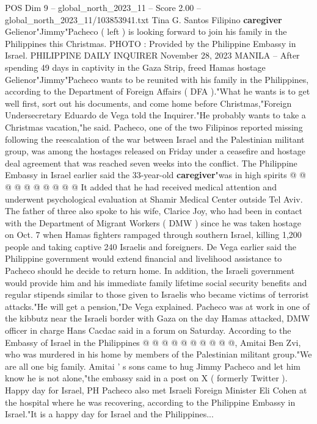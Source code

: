 \begin{textsample}{POS Dim 9 – global\_north\_2023\_11 – Score 2.00 – global\_north\_2023\_11/103853941.txt}  \label{ex:f9_pos_152}
Tina G.
Santos Filipino \textbf{caregiver} Gelienor"Jimmy"Pacheco ( left ) is looking forward to join his family in the Philippines this Christmas.
PHOTO : Provided by the Philippine Embassy in Israel.
PHILIPPINE DAILY INQUIRER November 28, 2023 MANILA -- After spending 49 days in captivity in the Gaza Strip, freed Hamas hostage Gelienor"Jimmy"Pacheco wants to be reunited with his family in the Philippines, according to the Department of Foreign Affairs ( DFA )."What he wants is to get well first, sort out his documents, and come home before Christmas,"Foreign Undersecretary Eduardo de Vega told the Inquirer."He probably wants to take a Christmas vacation,"he said.
Pacheco, one of the two Filipinos reported missing following the reescalation of the war between Israel and the Palestinian militant group, was among the hostages released on Friday under a ceasefire and hostage deal agreement that was reached seven weeks into the conflict.
The Philippine Embassy in Israel earlier said the 33-year-old \textbf{caregiver}"was in high spirits @ @ @ @ @ @ @ @ @ @ It added that he had received medical attention and underwent psychological evaluation at Shamir Medical Center outside Tel Aviv.
The father of three also spoke to his wife, Clarice Joy, who had been in contact with the Department of Migrant Workers ( DMW ) since he was taken hostage on Oct. 7 when Hamas fighters rampaged through southern Israel, killing 1,200 people and taking captive 240 Israelis and foreigners.
De Vega earlier said the Philippine government would extend financial and livelihood assistance to Pacheco should he decide to return home.
In addition, the Israeli government would provide him and his immediate family lifetime social security benefits and regular stipends similar to those given to Israelis who became victims of terrorist attacks."He will get a pension,"De Vega explained.
Pacheco was at work in one of the kibbutz near the Israeli border with Gaza on the day Hamas attacked, DMW officer in charge Hans Cacdac said in a forum on Saturday.
According to the Embassy of Israel in the Philippines @ @ @ @ @ @ @ @ @ @, Amitai Ben Zvi, who was murdered in his home by members of the Palestinian militant group."We are all one big family.
Amitai ' s sons came to hug Jimmy Pacheco and let him know he is not alone,"the embassy said in a post on X ( formerly Twitter ).
Happy day for Israel, PH Pacheco also met Israeli Foreign Minister Eli Cohen at the hospital where he was recovering, according to the Philippine Embassy in Israel."It is a happy day for Israel and the Philippines...

\end{textsample}
